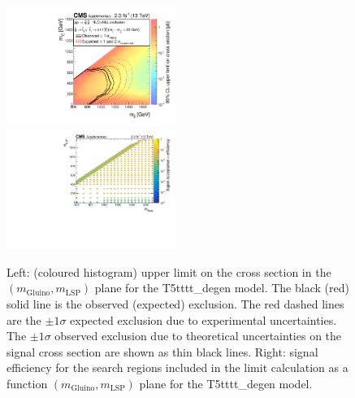 \clearpage
\begin{figure}[t]
  \begin{center}
    \includegraphics[width=0.49\textwidth]{RA1T5tttt-degenXSEC_aux} \, 
    \includegraphics[width=0.49\textwidth]{T5tttt_degen_merging_4_cats_aux} \,     
  \end{center}
  \caption{Left: (coloured histogram) upper limit on the cross section in the $(m_{\mathrm{Gluino}},m_{\mathrm{LSP}})$ plane for the T5tttt\_degen model. 
  The black (red) solid line is the observed (expected) exclusion. The red dashed lines are the $\pm1\sigma$ expected exclusion due to experimental uncertainties. 
  The $\pm1\sigma$ observed exclusion due to theoretical uncertainties on the signal cross section are shown as thin black lines. 
  Right: signal efficiency for the search regions included in the limit calculation as a function $(m_{\mathrm{Gluino}},m_{\mathrm{LSP}})$ plane for the T5tttt\_degen model. 
  \label{fig:T5tttt_degen_excl}}
\end{figure}

